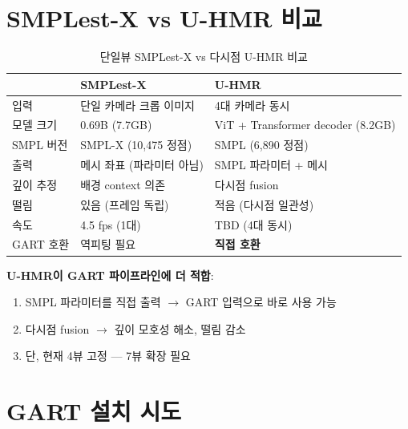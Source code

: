 \documentclass[11pt, a4paper]{report}
\begin{document}
\chapter{SMPLest-X vs U-HMR 비교}

\begin{table}[H]
\centering
\caption{단일뷰 SMPLest-X vs 다시점 U-HMR 비교}
\renewcommand{\arraystretch}{1.4}
\begin{tabular}{p{4cm} p{5cm} p{5cm}}
\toprule
& \textbf{SMPLest-X} & \textbf{U-HMR} \\
\midrule
입력 & 단일 카메라 크롭 이미지 & 4대 카메라 동시 \\
모델 크기 & 0.69B (7.7GB) & ViT + Transformer decoder (8.2GB) \\
SMPL 버전 & SMPL-X (10,475 정점) & SMPL (6,890 정점) \\
출력 & 메시 좌표 (파라미터 아님) & SMPL 파라미터 + 메시 \\
깊이 추정 & 배경 context 의존 & 다시점 fusion \\
떨림 & 있음 (프레임 독립) & 적음 (다시점 일관성) \\
속도 & 4.5 fps (1대) & TBD (4대 동시) \\
GART 호환 & 역피팅 필요 & \textbf{직접 호환} \\
\bottomrule
\end{tabular}
\end{table}

\begin{keyidea}
\textbf{U-HMR이 GART 파이프라인에 더 적합}:
\begin{enumerate}[leftmargin=*]
  \item SMPL 파라미터를 직접 출력 $\rightarrow$ GART 입력으로 바로 사용 가능
  \item 다시점 fusion $\rightarrow$ 깊이 모호성 해소, 떨림 감소
  \item 단, 현재 4뷰 고정 --- 7뷰 확장 필요
\end{enumerate}
\end{keyidea}


\chapter{GART 설치 시도}
\end{document}
